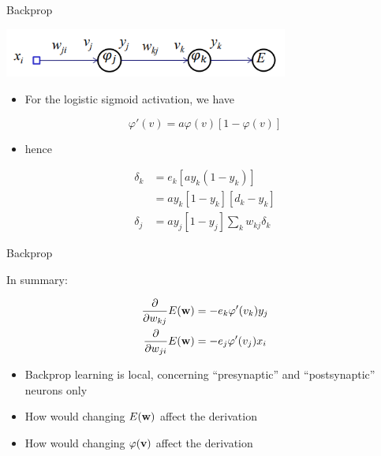 \documentclass[notes]{beamer}
\providecommand{\tightlist}{%
  \setlength{\itemsep}{0pt}\setlength{\parskip}{0pt}}
\begin{document}
\begin{frame}{Backprop}

\centering 

\includegraphics[width=0.70000\textwidth]{2018-03-10-13-49-42.png}\\

\begin{itemize}
\tightlist
\item
  For the logistic sigmoid activation, we have
\end{itemize}

\[\varphi ' ( v ) = a \varphi ( v )[1 -\varphi  ( v )]\]

\begin{itemize}
\tightlist
\item
  hence
\end{itemize}

\begin{align}
    \delta_ k & = e_k [ay_k (1 - y_k )]                       \\
              & = ay_k [1 - y_k ][d_ k - y_k ]                \\
    \delta_j  & = ay_ j [1 - y _j ]  \sum_{k} w_{kj} \delta_k
\end{align}

\end{frame}

\begin{frame}{Backprop}

In summary:

\begin{align}
    \frac{\partial }{\partial w_{kj} } E(\mathbf{w}) & =   -e_k \varphi ' (v_k) y_j \\
    \frac{\partial }{\partial w_{ji}} E(\mathbf{w})  & =   -e_j \varphi ' (v_j) x_i
\end{align}

\begin{itemize}
\tightlist
\item
  Backprop learning is local, concerning ``presynaptic'' and
  ``postsynaptic'' neurons only
\item
  How would changing \(E(\mathbf{w})\) affect the derivation
\item
  How would changing \(\varphi (\mathbf{v})\) affect the derivation
\end{itemize}

\end{frame}
\end{document}
